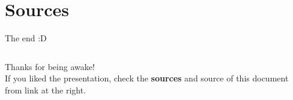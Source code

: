 \documentclass{beamer}
\begin{document}
\section{Sources}
\begin{frame} {The end :D}
  \begin{columns}
    Thanks for being awake! \\
    If you liked the presentation, check the \textbf{sources} and source of this document from link at the right.
  \end{columns}
\end{frame}
\end{document}
